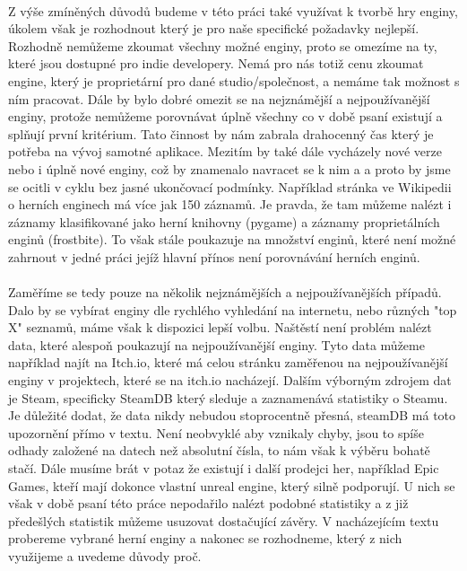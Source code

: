 \paragraph{}
	Z výše zmíněných důvodů budeme v této práci také využívat k tvorbě hry enginy, úkolem však je rozhodnout který je pro naše specifické požadavky nejlepší.
	Rozhodně nemůžeme zkoumat všechny možné enginy, proto se omezíme na ty, které jsou dostupné pro indie developery.
	Nemá pro nás totiž cenu zkoumat engine, který je proprietární pro dané studio/společnost, a nemáme tak možnost s ním pracovat.
	Dále by bylo dobré omezit se na nejznámější a nejpoužívanější enginy, protože nemůžeme porovnávat úplně všechny co v době psaní existují a splňují první kritérium.
	Tato činnost by nám zabrala drahocenný čas který je potřeba na vývoj samotné aplikace.
	Mezitím by také dále vycházely nové verze nebo i úplně nové enginy, což by znamenalo navracet se k nim a  a proto by jsme se ocitli v cyklu bez jasné ukončovací podmínky.
	Například stránka ve Wikipedii o herních enginech\cite{list_of_game_engines_wiki} má více jak 150 záznamů.
	Je pravda, že tam můžeme nalézt i záznamy klasifikované jako herní knihovny (pygame\cite{pygame}) a záznamy proprietálních enginů (frostbite\cite{frostbite}).
	To však stále poukazuje na množství enginů, které není možné zahrnout v jedné práci jejíž hlavní přínos není porovnávání herních enginů.

\paragraph{}
	Zaměříme se tedy pouze na několik nejznámějších a nejpoužívanějších případů.
	Dalo by se vybírat enginy dle rychlého vyhledání na internetu, nebo různých "top X" seznamů, máme však k dispozici lepší volbu.
	Naštěstí není problém nalézt data, které alespoň poukazují na nejpoužívanější enginy.
	Tyto data můžeme například najít na Itch.io\cite{itch_io_engines}, které má celou stránku zaměřenou na nejpoužívanější enginy v projektech, které se na itch.io nacházejí.
	Dalším výborným zdrojem dat je Steam, specificky SteamDB\cite{steamdb_engines} který sleduje a zaznamenává statistiky o Steamu.
	Je důležité dodat, že data nikdy nebudou stoprocentně přesná, steamDB má toto upozornění přímo v textu.
	Není neobvyklé aby vznikaly chyby, jsou to spíše odhady založené na datech než absolutní čísla, to nám však k výběru bohatě stačí.
	Dále musíme brát v potaz že existují i další prodejci her, například Epic Games, kteří mají dokonce vlastní unreal engine, který silně podporují.
	U nich se však v době psaní této práce nepodařilo nalézt podobné statistiky a z již předešlých statistik můžeme usuzovat dostačující závěry.
	V nacházejícím textu  probereme vybrané herní enginy a nakonec se rozhodneme, který z nich využijeme a uvedeme důvody proč.

